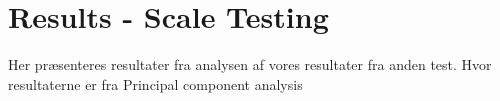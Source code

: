 \section{{\color{red}Results - Scale Testing}}
\label{ResultsScaleTesting}
%
{\color{red} Her præsenteres resultater fra analysen af vores resultater fra anden test. Hvor resultaterne er fra Principal component analysis}